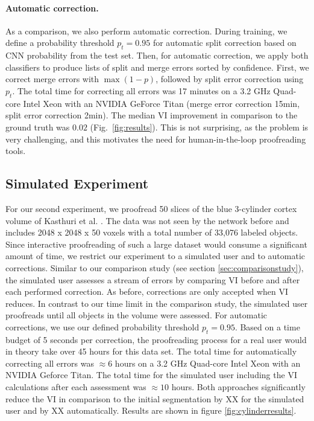 \paragraph{Automatic correction.} As a comparison, we also perform automatic correction. During training, we define a probability threshold $p_t=0.95$ for automatic split correction based on CNN probability from the test set. Then, for automatic correction, we apply both classifiers to produce lists of split and merge errors sorted by confidence. First, we correct merge errors with $\max(1-p)$, followed by split error correction using $p_t$. The total time for correcting all errors was 17 minutes on a 3.2 GHz Quad-core Intel Xeon with an NVIDIA GeForce Titan (merge error correction 15min, split error correction 2min). The median VI improvement in comparison to the ground truth was $0.02$ (Fig.~\ref{fig:results}). This is not surprising, as the problem is very challenging, and this motivates the need for human-in-the-loop proofreading tools.

\subsection{Simulated Experiment}

For our second experiment, we proofread 50 slices of the blue 3-cylinder cortex volume of Kasthuri et al. \cite{kasthuri2015saturated}. The data was not seen by the network before and includes 2048 x 2048 x 50 voxels with a total number of 33,076 labeled objects. Since interactive proofreading of such a large dataset would consume a significant amount of time, we restrict our experiment to a simulated user and to automatic corrections. Similar to our comparison study (see section \ref{sec:comparisonstudy}), the simulated user assesses a stream of errors by comparing VI before and after each performed correction. As before, corrections are only accepted when VI reduces. In contrast to our time limit in the comparison study, the simulated user proofreads until all objects in the volume were assessed. For automatic corrections, we use our defined probability threshold $p_t=0.95$. 
Based on a time budget of 5 seconds per correction, the proofreading process for a real user would in theory take over 45 hours for this data set. The total time for automatically correcting all errors was $\approx6$ hours on a 3.2 GHz Quad-core Intel Xeon with an NVIDIA Geforce Titan. The total time for the simulated user including the VI calculations after each assessment was $\approx10$ hours. Both approaches significantly reduce the VI in comparison to the initial segmentation by XX for the simulated user and by XX automatically. Results are shown in figure \ref{fig:cylinderresults}. 